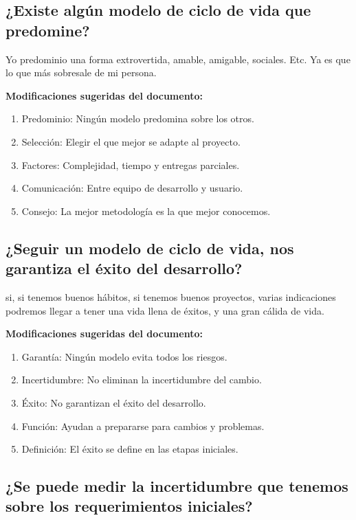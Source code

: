 \documentclass{article}
\begin{document}
\subsection{¿Existe algún modelo de ciclo de vida que predomine?}

Yo predominio una forma extrovertida, amable, amigable, sociales. Etc. Ya es que lo que más sobresale de mi persona.

\begin{framed}
\noindent\textbf{Modificaciones sugeridas del documento:}
\begin{enumerate}
    \item Predominio: Ningún modelo predomina sobre los otros.
    \item Selección: Elegir el que mejor se adapte al proyecto.
    \item Factores: Complejidad, tiempo y entregas parciales.
    \item Comunicación: Entre equipo de desarrollo y usuario.
    \item Consejo: La mejor metodología es la que mejor conocemos.
\end{enumerate}
\end{framed}

\subsection{¿Seguir un modelo de ciclo de vida, nos garantiza el éxito del desarrollo?}

si, si tenemos buenos hábitos, si tenemos buenos proyectos, varias indicaciones podremos llegar a tener una vida llena de éxitos, y una gran cálida de vida.

\begin{framed}
\noindent\textbf{Modificaciones sugeridas del documento:}
\begin{enumerate}
    \item Garantía: Ningún modelo evita todos los riesgos.
    \item Incertidumbre: No eliminan la incertidumbre del cambio.
    \item Éxito: No garantizan el éxito del desarrollo.
    \item Función: Ayudan a prepararse para cambios y problemas.
    \item Definición: El éxito se define en las etapas iniciales.
\end{enumerate}
\end{framed}

\subsection{¿Se puede medir la incertidumbre que tenemos sobre los requerimientos iniciales?}
\end{document}
